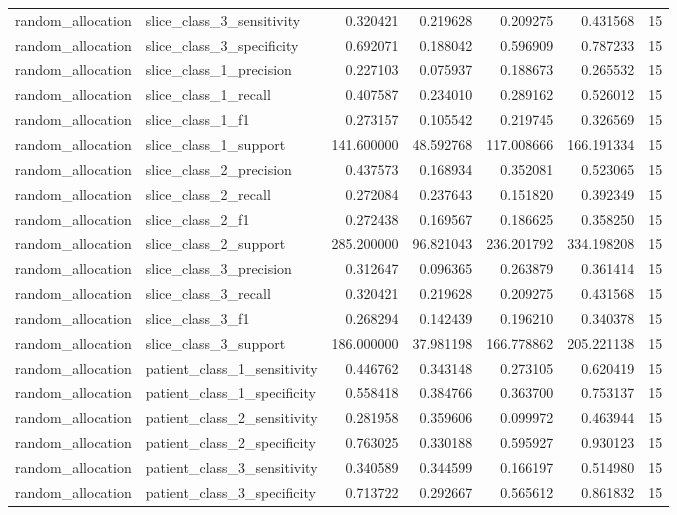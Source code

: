 \begin{tabular}{llrrrrr}
random_allocation & slice_class_3_sensitivity & 0.320421 & 0.219628 & 0.209275 & 0.431568 & 15 \\
random_allocation & slice_class_3_specificity & 0.692071 & 0.188042 & 0.596909 & 0.787233 & 15 \\
random_allocation & slice_class_1_precision & 0.227103 & 0.075937 & 0.188673 & 0.265532 & 15 \\
random_allocation & slice_class_1_recall & 0.407587 & 0.234010 & 0.289162 & 0.526012 & 15 \\
random_allocation & slice_class_1_f1 & 0.273157 & 0.105542 & 0.219745 & 0.326569 & 15 \\
random_allocation & slice_class_1_support & 141.600000 & 48.592768 & 117.008666 & 166.191334 & 15 \\
random_allocation & slice_class_2_precision & 0.437573 & 0.168934 & 0.352081 & 0.523065 & 15 \\
random_allocation & slice_class_2_recall & 0.272084 & 0.237643 & 0.151820 & 0.392349 & 15 \\
random_allocation & slice_class_2_f1 & 0.272438 & 0.169567 & 0.186625 & 0.358250 & 15 \\
random_allocation & slice_class_2_support & 285.200000 & 96.821043 & 236.201792 & 334.198208 & 15 \\
random_allocation & slice_class_3_precision & 0.312647 & 0.096365 & 0.263879 & 0.361414 & 15 \\
random_allocation & slice_class_3_recall & 0.320421 & 0.219628 & 0.209275 & 0.431568 & 15 \\
random_allocation & slice_class_3_f1 & 0.268294 & 0.142439 & 0.196210 & 0.340378 & 15 \\
random_allocation & slice_class_3_support & 186.000000 & 37.981198 & 166.778862 & 205.221138 & 15 \\
random_allocation & patient_class_1_sensitivity & 0.446762 & 0.343148 & 0.273105 & 0.620419 & 15 \\
random_allocation & patient_class_1_specificity & 0.558418 & 0.384766 & 0.363700 & 0.753137 & 15 \\
random_allocation & patient_class_2_sensitivity & 0.281958 & 0.359606 & 0.099972 & 0.463944 & 15 \\
random_allocation & patient_class_2_specificity & 0.763025 & 0.330188 & 0.595927 & 0.930123 & 15 \\
random_allocation & patient_class_3_sensitivity & 0.340589 & 0.344599 & 0.166197 & 0.514980 & 15 \\
random_allocation & patient_class_3_specificity & 0.713722 & 0.292667 & 0.565612 & 0.861832 & 15 \\

\end{tabular}
